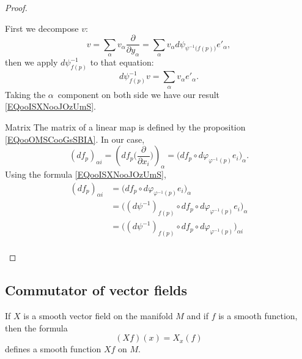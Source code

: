 \begin{proof}
\begin{subproof}
            First we decompose \( v\):
            \begin{equation}
                v=\sum_{\alpha}v_{\alpha}\frac{ \partial  }{ \partial y_{\alpha} }=\sum_{\alpha}v_{\alpha}d\psi_{\psi^{-1}\big( f(p) \big)}e'_{\alpha},
            \end{equation}
            then we apply \( d\psi^{-1}_{f(p)}\) to that equation:
            \begin{equation}
                d\psi^{-1}_{f(p)}v=\sum_{\alpha}v_{\alpha}e'_{\alpha}.
            \end{equation}
            Taking the \( \alpha\)\th\ component on both side we have our result \eqref{EQooISXNooJOzUmS}.
        \item[Matrix]
            The matrix of a linear map is defined by the proposition \ref{EQooOMSCooGsSBIA}. In our case,
            \begin{equation}
                    (df_p)_{\alpha i}=\left( df_p\big( \frac{ \partial  }{ \partial x_i } \big) \right)_{\alpha} =\Big( df_p\circ d\varphi_{\varphi^{-1}(p)}e_i \Big)_{\alpha}.
            \end{equation}
            Using the formula \eqref{EQooISXNooJOzUmS},
            \begin{subequations}
                \begin{align}
                    (df_p)_{\alpha i}&=\Big( df_p\circ d\varphi_{\varphi^{-1}(p)}e_i \Big)_{\alpha}\\
                    &=\big( (d\psi^{-1})_{f(p)}\circ df_p\circ d\varphi_{\varphi^{-1}(p)}e_i \big)_{\alpha}\\
                    &=\big( (d\psi^{-1})_{f(p)}\circ df_p\circ d\varphi_{\varphi^{-1}(p)} \big)_{\alpha i}\\
                \end{align}
            \end{subequations}
    \end{subproof}
\end{proof}

\subsection{Commutator of vector fields}

\begin{lemma}       \label{LEMooPSWEooVKLWMQ}
    If \( X\) is a smooth vector field on the manifold \( M\) and if \( f\) is a smooth function, then the formula
    \begin{equation}
        (Xf)(x)=X_x(f)
    \end{equation}
    defines a smooth function \( Xf\) on \( M\).
\end{lemma}

